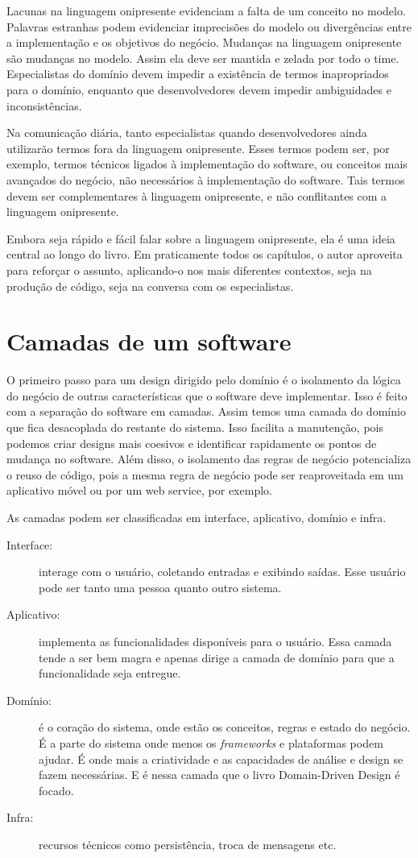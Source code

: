 \documentclass[a4paper, 12pt]{article}
\newcommand{\lgg}{linguagem onipresente\xspace}
\begin{document}
Lacunas na linguagem onipresente evidenciam a falta de um conceito no modelo. Palavras estranhas podem evidenciar imprecisões do modelo ou divergências entre a implementação e os objetivos do negócio. Mudanças na linguagem onipresente são mudanças no modelo. Assim ela deve ser mantida e zelada por todo o time. Especialistas do domínio devem impedir a existência de termos inapropriados para o domínio, enquanto que desenvolvedores devem impedir ambiguidades e inconsistências.

Na comunicação diária, tanto especialistas quando desenvolvedores ainda utilizarão termos fora da linguagem onipresente. Esses termos podem ser, por exemplo, termos técnicos ligados à implementação do software, ou conceitos mais avançados do negócio, não necessários à implementação do software. Tais termos devem ser complementares à linguagem onipresente, e não conflitantes com a linguagem onipresente.

Embora seja rápido e fácil falar sobre a \lgg, ela é uma ideia central ao longo do livro. Em praticamente todos os capítulos, o autor aproveita para reforçar o assunto, aplicando-o nos mais diferentes contextos, seja na produção de código, seja na conversa com os especialistas.


\section{Camadas de um software}

O primeiro passo para um design dirigido pelo domínio é o isolamento da lógica do negócio de outras características que o software deve implementar. Isso é feito com a separação do software em camadas. Assim temos uma camada do domínio que fica desacoplada do restante do sistema. Isso facilita a manutenção, pois podemos criar designs mais coesivos e identificar rapidamente os pontos de mudança no software. Além disso, o isolamento das regras de negócio potencializa o reuso de código, pois a mesma regra de negócio pode ser reaproveitada em um aplicativo móvel ou por um web service, por exemplo.

As camadas podem ser classificadas em interface, aplicativo, domínio e infra.

\begin{description}
\item [Interface:] interage com o usuário, coletando entradas e exibindo saídas. Esse usuário pode ser tanto uma pessoa quanto outro sistema.
\item [Aplicativo:] implementa as funcionalidades disponíveis para o usuário. Essa camada tende a ser bem magra e apenas dirige a camada de domínio para que a funcionalidade seja entregue.
\item [Domínio:] é o coração do sistema, onde estão os conceitos, regras e estado do negócio. É a parte do sistema onde menos os \emph{frameworks} e plataformas podem ajudar. É onde mais a criatividade e as capacidades de análise e design se fazem necessárias. E é nessa camada que o livro Domain-Driven Design é focado.
\item [Infra:] recursos técnicos como persistência, troca de mensagens etc.
\end{description}
\end{document}
